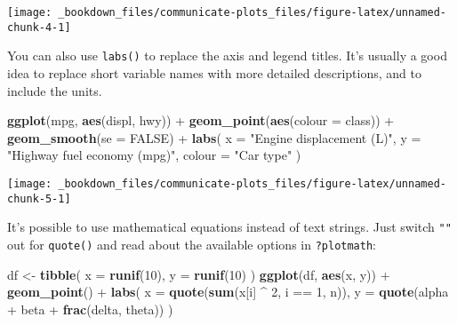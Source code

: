 \documentclass[]{book}
\newenvironment{Shaded}{\begin{snugshade}}{\end{snugshade}}
\newcommand{\KeywordTok}[1]{\textcolor[rgb]{0.13,0.29,0.53}{\textbf{{#1}}}}
\newcommand{\DataTypeTok}[1]{\textcolor[rgb]{0.13,0.29,0.53}{{#1}}}
\newcommand{\DecValTok}[1]{\textcolor[rgb]{0.00,0.00,0.81}{{#1}}}
\newcommand{\StringTok}[1]{\textcolor[rgb]{0.31,0.60,0.02}{{#1}}}
\newcommand{\OtherTok}[1]{\textcolor[rgb]{0.56,0.35,0.01}{{#1}}}
\newcommand{\NormalTok}[1]{{#1}}
\begin{document}
\begin{center}\texttt{[image: \_bookdown\_files/communicate-plots\_files/figure-latex/unnamed-chunk-4-1]} \end{center}

You can also use \texttt{labs()} to replace the axis and legend titles.
It's usually a good idea to replace short variable names with more
detailed descriptions, and to include the units.

\begin{Shaded}
\begin{Highlighting}[]
\KeywordTok{ggplot}\NormalTok{(mpg, }\KeywordTok{aes}\NormalTok{(displ, hwy)) +}
\StringTok{  }\KeywordTok{geom_point}\NormalTok{(}\KeywordTok{aes}\NormalTok{(}\DataTypeTok{colour =} \NormalTok{class)) +}
\StringTok{  }\KeywordTok{geom_smooth}\NormalTok{(}\DataTypeTok{se =} \OtherTok{FALSE}\NormalTok{) +}
\StringTok{  }\KeywordTok{labs}\NormalTok{(}
    \DataTypeTok{x =} \StringTok{"Engine displacement (L)"}\NormalTok{,}
    \DataTypeTok{y =} \StringTok{"Highway fuel economy (mpg)"}\NormalTok{,}
    \DataTypeTok{colour =} \StringTok{"Car type"}
  \NormalTok{)}
\end{Highlighting}
\end{Shaded}

\begin{center}\texttt{[image: \_bookdown\_files/communicate-plots\_files/figure-latex/unnamed-chunk-5-1]} \end{center}

It's possible to use mathematical equations instead of text strings.
Just switch \texttt{""} out for \texttt{quote()} and read about the
available options in \texttt{?plotmath}:

\begin{Shaded}
\begin{Highlighting}[]
\NormalTok{df <-}\StringTok{ }\KeywordTok{tibble}\NormalTok{(}
  \DataTypeTok{x =} \KeywordTok{runif}\NormalTok{(}\DecValTok{10}\NormalTok{),}
  \DataTypeTok{y =} \KeywordTok{runif}\NormalTok{(}\DecValTok{10}\NormalTok{)}
\NormalTok{)}
\KeywordTok{ggplot}\NormalTok{(df, }\KeywordTok{aes}\NormalTok{(x, y)) +}
\StringTok{  }\KeywordTok{geom_point}\NormalTok{() +}
\StringTok{  }\KeywordTok{labs}\NormalTok{(}
    \DataTypeTok{x =} \KeywordTok{quote}\NormalTok{(}\KeywordTok{sum}\NormalTok{(x[i] ^}\StringTok{ }\DecValTok{2}\NormalTok{, i ==}\StringTok{ }\DecValTok{1}\NormalTok{, n)),}
    \DataTypeTok{y =} \KeywordTok{quote}\NormalTok{(alpha +}\StringTok{ }\NormalTok{beta +}\StringTok{ }\KeywordTok{frac}\NormalTok{(delta, theta))}
  \NormalTok{)}
\end{Highlighting}
\end{Shaded}
\end{document}
